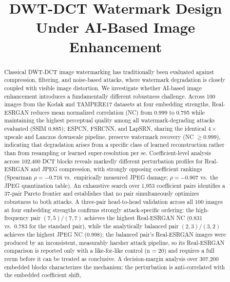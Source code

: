 \documentclass[conference]{IEEEtran}
\begin{document}
\title{DWT-DCT Watermark Design Under AI-Based Image Enhancement}

\author{
}

\maketitle

\begin{abstract}
Classical DWT-DCT image watermarking has traditionally been evaluated
against compression, filtering, and noise-based attacks, where watermark
degradation is closely coupled with visible image distortion. We
investigate whether AI-based image enhancement introduces a fundamentally
different robustness challenge. Across 100 images from the Kodak and
TAMPERE17 datasets at four embedding strengths, Real-ESRGAN reduces mean
normalized correlation (NC) from 0.999 to 0.795 while maintaining the
highest perceptual quality among all watermark-degrading attacks
evaluated (SSIM 0.885);
ESPCN, FSRCNN, and LapSRN, sharing the identical $4\times$ upscale and
Lanczos downscale pipeline, preserve watermark recovery
(NC $\geq 0.999$), indicating that degradation arises from a specific
class of learned reconstruction rather than from resampling or learned
super-resolution per se. Coefficient-level analysis across 102,400 DCT blocks reveals
markedly different perturbation profiles for Real-ESRGAN and JPEG
compression, with strongly opposing coefficient rankings (Spearman
$\rho = -0.716$ vs.\ empirically measured JPEG damage; $\rho = -0.907$
vs.\ the JPEG quantization table). An exhaustive search over 1,953
coefficient pairs identifies a 37-pair Pareto frontier and establishes
that no pair simultaneously optimizes robustness to both attacks. A
three-pair head-to-head validation across all 100 images at four
embedding strengths confirms strongly attack-specific ordering: the
high-frequency pair $(7,5)/(7,7)$ achieves the highest Real-ESRGAN NC
(0.831 vs.\ 0.783 for the standard pair), while the analytically
balanced pair $(2,3)/(3,2)$ achieves the highest JPEG NC (0.998); the
balanced pair's Real-ESRGAN images were produced by an inconsistent,
measurably harsher attack pipeline, so its Real-ESRGAN comparison is
reported only with a like-for-like control (n = 20) and requires a full
rerun before it can be treated as conclusive. A decision-margin
analysis over 307,200 embedded blocks characterizes the mechanism: the
perturbation is anti-correlated with the embedded coefficient shift,

\end{abstract}
\end{document}
